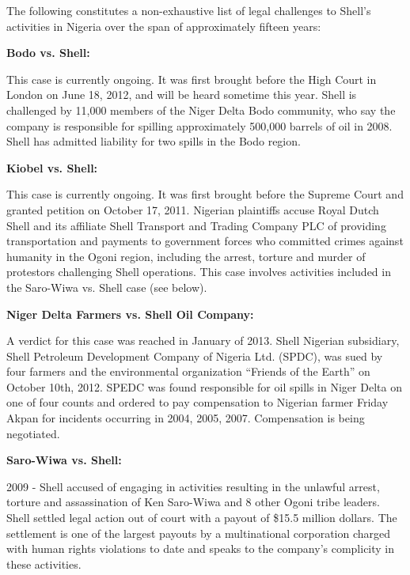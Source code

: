 The following constitutes a non-exhaustive list of legal challenges to Shell’s activities in Nigeria over the span of approximately fifteen years:



\textbf{Bodo vs. Shell:}



This case is currently ongoing. It was first brought before the High Court in London on June 18, 2012, and will be heard sometime this year. Shell is challenged by 11,000 members of the Niger Delta Bodo community, who say the company is responsible for spilling approximately 500,000 barrels of oil in 2008. Shell has admitted liability for two spills in the Bodo region. 



\textbf{Kiobel vs. Shell:} 


This case is currently ongoing. It was first brought before the Supreme Court and granted petition on October 17, 2011. Nigerian plaintiffs accuse Royal Dutch Shell and its affiliate Shell Transport and Trading Company PLC of providing transportation and payments to government forces who committed crimes against humanity in the Ogoni region, including the arrest, torture and murder of protestors challenging Shell operations. This case involves activities included in the Saro-Wiwa vs. Shell case (see below).



\textbf{Niger Delta Farmers vs. Shell Oil Company:} 



A verdict for this case was reached in January of 2013. Shell Nigerian subsidiary, Shell Petroleum Development Company of Nigeria Ltd. (SPDC), was sued by four farmers and the environmental organization “Friends of the Earth” on October 10th, 2012. SPEDC was found responsible for oil spills in Niger Delta on one of four counts and ordered to pay compensation to Nigerian farmer Friday Akpan for incidents occurring in 2004, 2005, 2007. Compensation is being negotiated. 



\textbf{Saro-Wiwa vs. Shell:}



2009 - Shell accused of engaging in activities resulting in the unlawful arrest, torture and assassination of Ken Saro-Wiwa and 8 other Ogoni tribe leaders. Shell settled legal action out of court with a payout of \$15.5 million dollars. The settlement is one of the largest payouts by a multinational corporation charged with human rights violations to date and speaks to the company’s complicity in these activities.



